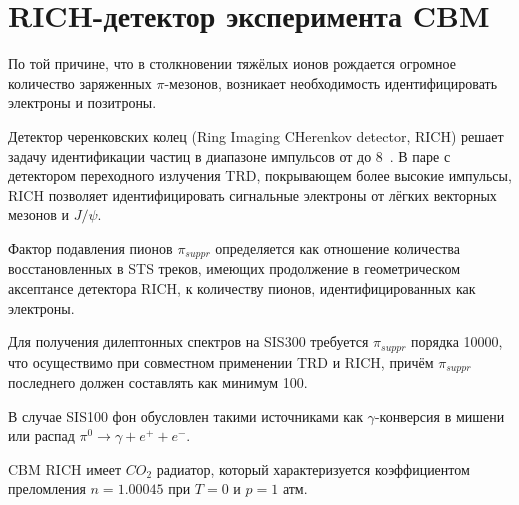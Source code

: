 \section{RICH-детектор эксперимента CBM}



По той причине, что в столкновении тяжёлых ионов рождается огромное количество заряженных $\pi$-мезонов, возникает необходимость идентифицировать электроны и позитроны.

Детектор черенковских колец (Ring Imaging CHerenkov detector, RICH) решает задачу идентификации частиц в диапазоне импульсов от до 8~\GeVoverC{}.
В паре с детектором переходного излучения TRD, покрывающем более высокие импульсы, RICH позволяет идентифицировать сигнальные электроны от лёгких векторных мезонов и $J/\psi$.

Фактор подавления пионов $\pi_{suppr}$ определяется как отношение количества восстановленных в STS треков, имеющих продолжение в геометрическом аксептансе детектора RICH, к количеству пионов, идентифицированных как электроны.

Для получения дилептонных спектров на SIS300 требуется $\pi_{suppr}$ порядка 10000, что осуществимо при совместном применении TRD и RICH, причём $\pi_{suppr}$ последнего должен составлять как минимум 100.

В случае SIS100 фон обусловлен такими источниками как $\gamma$-конверсия в мишени или распад $\pi^{0} \rightarrow \gamma + e^{+} + e^{-}$.






CBM RICH имеет $CO_{2}$ радиатор, который характеризуется коэффициентом преломления $n=1.00045$ при $T=0$ и $p=1$ атм.



